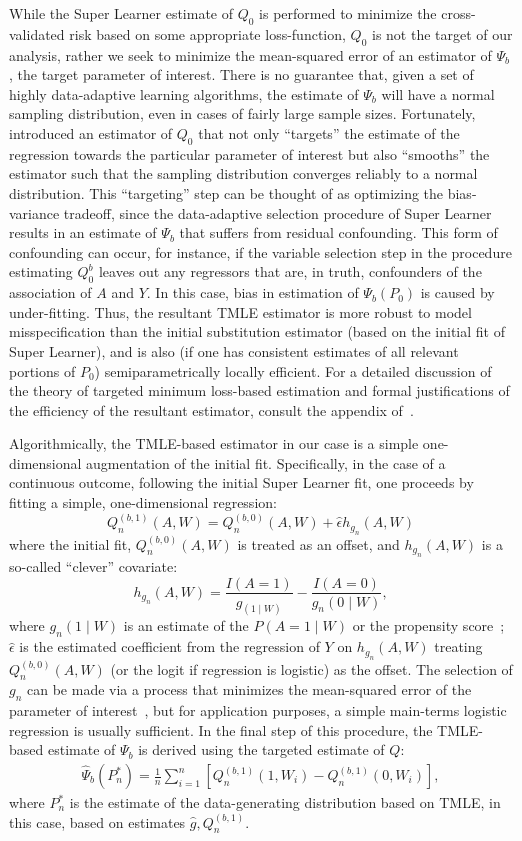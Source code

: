 While the Super Learner estimate of $Q_0$ is performed to minimize the
cross-validated risk based on some appropriate loss-function, $Q_0$ is not the
target of our analysis, rather we seek to minimize the mean-squared error of an
estimator of $\Psi_b$, the target parameter of interest. There is no guarantee
that, given a set of highly data-adaptive learning algorithms, the estimate of
$\Psi_b$ will have a normal sampling distribution, even in cases of fairly large
sample sizes. Fortunately,~\cite{van2011targeted} introduced an estimator of
$Q_0$ that not only ``targets'' the estimate of the regression towards the
particular parameter of interest but also ``smooths'' the estimator such that
the sampling distribution converges reliably to a normal distribution. This
``targeting'' step can be thought of as optimizing the bias-variance tradeoff,
since the data-adaptive selection procedure of Super Learner results in an
estimate of $\Psi_b$ that suffers from residual confounding. This form of
confounding can occur, for instance, if the variable selection step in the
procedure estimating $Q^b_0$ leaves out any regressors that are, in truth,
confounders of the association of $A$ and $Y$. In this case, bias in estimation
of $\Psi_b(P_0)$ is caused by under-fitting. Thus, the resultant TMLE estimator
is more robust to model misspecification than the initial substitution estimator
(based on the initial fit of Super Learner), and is also (if one has consistent
estimates of all relevant portions of $P_0$) semiparametrically locally
efficient. For a detailed discussion of the theory of targeted minimum
loss-based estimation and formal justifications of the efficiency of the
resultant estimator, consult the appendix of~\cite{van2011targeted}.

Algorithmically, the TMLE-based estimator in our case is a simple
one-dimensional augmentation of the initial fit. Specifically, in the case of
a continuous outcome, following the initial Super Learner fit, one proceeds by
fitting a simple, one-dimensional regression:
$$
Q^{(b, 1)}_n(A, W) = Q^{(b, 0)}_n(A, W) + \hat{\epsilon} h_{g_n}(A, W)
$$
where the initial fit, $Q^{(b, 0)}_n(A, W)$ is treated as an offset, and
$h_{g_n}(A, W)$ is a so-called ``clever'' covariate:
$$
h_{g_n}(A, W) = \frac{I(A = 1)}{g_(1 \mid W)} - \frac{I(A = 0)}{g_n(0 \mid W)}
,$$
where $g_n(1 \mid W)$ is an estimate of the $P(A = 1 \mid W)$ or the propensity
score~\cite{rosenbaum1983central}; $\hat{\epsilon}$ is the estimated coefficient
from the regression of $Y$ on $h_{g_n}(A, W)$ treating $Q^{(b, 0)}_n(A, W)$ (or
the logit if regression is logistic) as the offset. The selection of $g_n$ can
be made via a process that minimizes the mean-squared error of the parameter of
interest~\cite{gruber2010application}, but for application purposes, a simple
main-terms logistic regression is usually sufficient. In the final step of this
procedure, the TMLE-based estimate of $\Psi_b$ is derived using the targeted
estimate of $Q$:
\begin{eqnarray}
\hat{\Psi}_b(P^*_n) = \frac{1}{n}\sum^{n}_{i = 1}[Q^{(b, 1)}_n(1, W_i) - Q^{(b, 1)}_{n}(0, W_i)],
\end{eqnarray}
where $P^*_n$ is the estimate of the data-generating distribution based on TMLE,
in this case, based on estimates $\hat{g},Q^{(b,1)}_n$.

